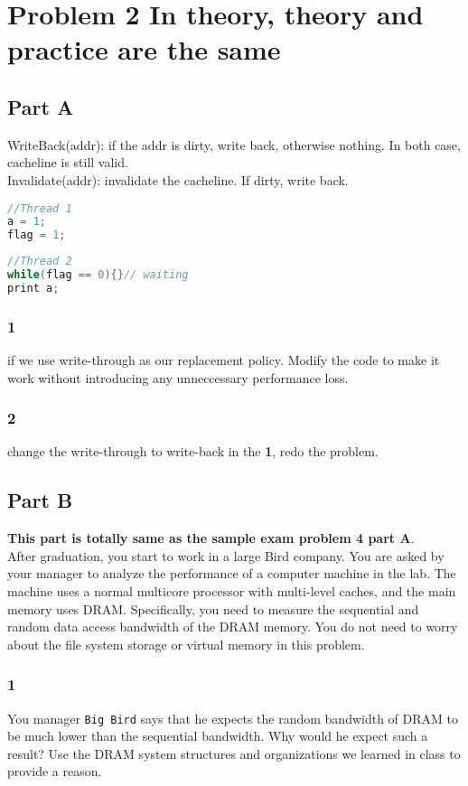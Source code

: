 \documentclass{article}
\begin{document}
\section*{Problem 2 In theory, theory and practice are the same}
\subsection*{Part A}
WriteBack(addr): if the addr is dirty, write back, otherwise nothing. In both case, cacheline is still valid.\\
Invalidate(addr): invalidate the cacheline. If dirty, write back.\\
\begin{lstlisting}[language=C]
//Thread 1
a = 1;
flag = 1;
\end{lstlisting}
\begin{lstlisting}[language=C]
//Thread 2
while(flag == 0){}// waiting
print a;
\end{lstlisting}
\subsubsection*{1}
if we use write-through as our replacement policy. Modify the code to make it work without introducing any unneccessary performance loss.\\
\subsubsection*{2}
change the write-through to write-back in the \textbf{1}, redo the problem.
\subsection*{Part B}
\textbf{This part is totally same as the sample exam problem 4 part A}.\\
After graduation, you start to work in a large Bird company. You are asked by your manager to 
analyze the performance of a computer machine in the lab. The machine uses a normal multicore
 processor with multi-level caches, and the main memory uses DRAM. Specifically, you 
need to measure the sequential and random data access bandwidth of the DRAM memory. 
You do not need to worry about the file system storage or virtual memory in this problem. 
\subsubsection*{1}
You manager \texttt{Big Bird} says that he expects the random bandwidth of DRAM to be much 
lower than the sequential bandwidth. Why would he expect such a result? Use the DRAM 
system structures and organizations we learned in class to provide a reason.
\end{document}
